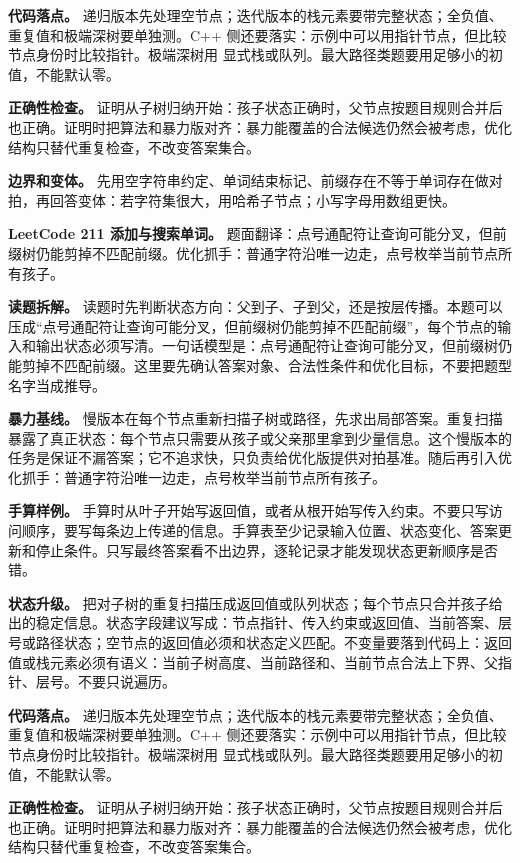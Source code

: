 \textbf{代码落点。} 递归版本先处理空节点；迭代版本的栈元素要带完整状态；全负值、重复值和极端深树要单独测。C++ 侧还要落实：示例中可以用指针节点，但比较节点身份时比较指针。极端深树用  显式栈或队列。最大路径类题要用足够小的初值，不能默认零。

\textbf{正确性检查。} 证明从子树归纳开始：孩子状态正确时，父节点按题目规则合并后也正确。证明时把算法和暴力版对齐：暴力能覆盖的合法候选仍然会被考虑，优化结构只替代重复检查，不改变答案集合。

\textbf{边界和变体。} 先用空字符串约定、单词结束标记、前缀存在不等于单词存在做对拍，再回答变体：若字符集很大，用哈希子节点；小写字母用数组更快。

\noindent\textbf{LeetCode 211 添加与搜索单词。} 题面翻译：点号通配符让查询可能分叉，但前缀树仍能剪掉不匹配前缀。优化抓手：普通字符沿唯一边走，点号枚举当前节点所有孩子。

\textbf{读题拆解。} 读题时先判断状态方向：父到子、子到父，还是按层传播。本题可以压成“点号通配符让查询可能分叉，但前缀树仍能剪掉不匹配前缀”，每个节点的输入和输出状态必须写清。一句话模型是：点号通配符让查询可能分叉，但前缀树仍能剪掉不匹配前缀。这里要先确认答案对象、合法性条件和优化目标，不要把题型名字当成推导。

\textbf{暴力基线。} 慢版本在每个节点重新扫描子树或路径，先求出局部答案。重复扫描暴露了真正状态：每个节点只需要从孩子或父亲那里拿到少量信息。这个慢版本的任务是保证不漏答案；它不追求快，只负责给优化版提供对拍基准。随后再引入优化抓手：普通字符沿唯一边走，点号枚举当前节点所有孩子。

\textbf{手算样例。} 手算时从叶子开始写返回值，或者从根开始写传入约束。不要只写访问顺序，要写每条边上传递的信息。手算表至少记录输入位置、状态变化、答案更新和停止条件。只写最终答案看不出边界，逐轮记录才能发现状态更新顺序是否错。

\textbf{状态升级。} 把对子树的重复扫描压成返回值或队列状态；每个节点只合并孩子给出的稳定信息。状态字段建议写成：节点指针、传入约束或返回值、当前答案、层号或路径状态；空节点的返回值必须和状态定义匹配。不变量要落到代码上：返回值或栈元素必须有语义：当前子树高度、当前路径和、当前节点合法上下界、父指针、层号。不要只说遍历。

\textbf{代码落点。} 递归版本先处理空节点；迭代版本的栈元素要带完整状态；全负值、重复值和极端深树要单独测。C++ 侧还要落实：示例中可以用指针节点，但比较节点身份时比较指针。极端深树用  显式栈或队列。最大路径类题要用足够小的初值，不能默认零。

\textbf{正确性检查。} 证明从子树归纳开始：孩子状态正确时，父节点按题目规则合并后也正确。证明时把算法和暴力版对齐：暴力能覆盖的合法候选仍然会被考虑，优化结构只替代重复检查，不改变答案集合。

